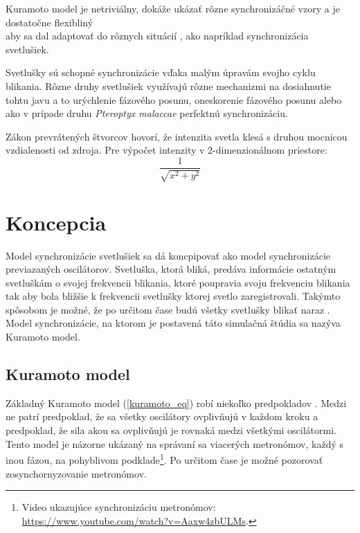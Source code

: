 \documentclass[a4paper, 11pt]{article}
\begin{document}
Kuramoto model je netriviálny, dokáže ukázať rôzne synchronizáčné vzory a je dostatočne flexibliný\\ aby sa dal adaptovať do rôznych situácií \cite{Kuramoto2}, ako napríklad synchronizácia svetlušiek.

\vspace{1em}
\noindent 
Svetlušky sú schopné synchronizácie vďaka malým úpravám svojho cyklu blikania. \cite{Svetlusky}\cite{NatGeoSvetlusky} Rôzne druhy svetlušiek využívajú rôzne mechanizmi na dosiahnutie tohtu javu a to urýchlenie fázového posunu, oneskorenie fázového posunu alebo ako v prípade druhu \textit{Pteroptyx malaccae} perfektnú synchronizáciu.\cite{Svetlusky}

\vspace{1em}
\noindent 
Zákon prevrátených štvorcov hovorí, že intenzita svetla klesá s druhou mocnicou vzdialenosti od zdroja. \cite{InverseLaw} Pre výpočet intenzity v 2-dimenzionálnom priestore:
\begin{equation} \label{inverse_eq}
    \frac{1}{\sqrt{x^2+y^2}}
\end{equation}














\pagebreak 
\section{Koncepcia}
Model synchronizácie svetlušiek sa dá koncpipovať ako model synchronizácie previazaných oscilátorov. Svetluška, ktorá bliká, predáva informácie ostatným svetluškám o svojej frekvencii blikania, ktoré poupravia svoju frekvenciu blikania tak aby bola bližšie k frekvencii svetlušky ktorej svetlo zaregistrovali. Takýmto spôsobom je možné, že po určitom čase budú všetky svetlušky blikať naraz \cite{NatGeoSvetlusky}. Model synchronizácie, na ktorom je postavená táto simulačná štúdia sa nazýva Kuramoto model.

\subsection{Kuramoto model}

Základný Kuramoto model (\ref{kuramoto_eq}) robí niekoľko predpokladov \cite{Kuramoto2}. Medzi ne patrí predpoklad, že sa všetky oscilátory ovplivňujú v každom kroku a predpoklad, že sila akou sa ovplivňujú je rovnaká medzi všetkými oscilátormi. Tento model je názorne ukázaný na správaní sa viacerých metronómov, každý s inou fázou, na pohyblivom podklade\footnote{Video ukazujúce synchronizáciu metronómov:
\href{https://www.youtube.com/watch?v=Aaxw4zbULMs}{https://www.youtube.com/watch?v=Aaxw4zbULMs}.}. Po určitom čase je možné pozorovať zosynchornyzovanie metronómov.
\end{document}

